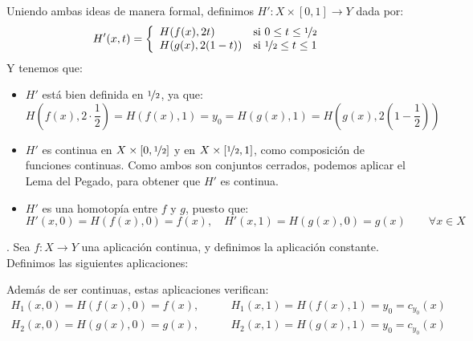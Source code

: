 \begin{ejercicio}
\begin{description}
\begin{description}
                Uniendo ambas ideas de manera formal, definimos $H':X\times [0,1]\to Y$ dada por:
                \begin{equation*}
                    H'(x,t) = \left\{\begin{array}{ll}
                        H(f(x),2t) & \text{si\ } 0\leq t \leq \nicefrac{1}{2} \\
                        H(g(x),2(1-t)) & \text{si\ } \nicefrac{1}{2}\leq t \leq 1
                    \end{array}\right. 
                \end{equation*}
                Y tenemos que:
                \begin{itemize}
                    \item $H'$ está bien definida en $\nicefrac{1}{2}$, ya que:
                        \begin{equation*}
                            H\left(f(x), 2\cdot \frac{1}{2}\right) = H(f(x),1) = y_0 = H(g(x),1) = H\left(g(x), 2\left(1-\frac{1}{2}\right)\right)
                        \end{equation*}
                    \item $H'$ es continua en $X\times [0,\nicefrac{1}{2}]$ y en $X\times [\nicefrac{1}{2},1]$, como composición de funciones continuas. Como ambos son conjuntos cerrados, podemos aplicar el Lema del Pegado, para obtener que $H'$ es continua.
                    \item $H'$ es una homotopía entre $f$ y $g$, puesto que:
                        \begin{equation*}
                            H'(x,0) = H(f(x),0) = f(x), \quad H'(x,1) = H(g(x),0) = g(x) \qquad \forall x\in X
                        \end{equation*}
                \end{itemize}
                
                \item[Relación de equivalencia]. Sea $f:X\to Y$ una aplicación continua, y definimos
                la aplicación constante. Definimos las siguientes aplicaciones:

                Además de ser continuas, estas aplicaciones verifican:
                \begin{align*}
                    H_1(x,0) = H(f(x),0) = f(x), \qquad &H_1(x,1) = H(f(x),1) = y_0 = c_{y_0}(x)\\
                    H_2(x,0) = H(g(x),0) = g(x), \qquad &H_2(x,1) = H(g(x),1) = y_0 = c_{y_0}(x)
                \end{align*}
                

\end{description}
\end{description}
\end{ejercicio}

